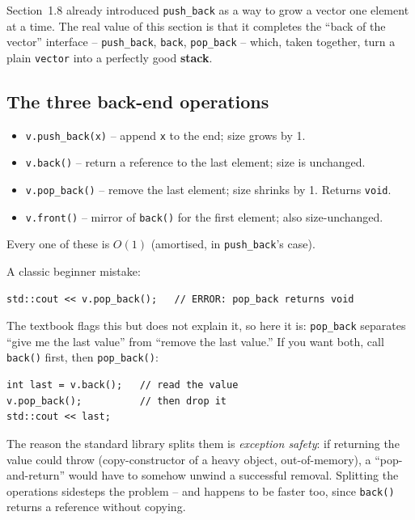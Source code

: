 \documentclass[11pt]{article}
\begin{document}
Section~1.8 already introduced \texttt{push\_back} as a way to grow a
vector one element at a time. The real value of this section is that
it completes the ``back of the vector'' interface -- \texttt{push\_back},
\texttt{back}, \texttt{pop\_back} -- which, taken together, turn a
plain \texttt{vector} into a perfectly good \textbf{stack}.

\subsection{The three back-end operations}

\begin{defnbox}
\begin{itemize}
    \item \texttt{v.push\_back(x)} -- append \texttt{x} to the end;
          size grows by 1.
    \item \texttt{v.back()} -- return a reference to the last element;
          size is unchanged.
    \item \texttt{v.pop\_back()} -- remove the last element; size
          shrinks by 1. Returns \texttt{void}.
    \item \texttt{v.front()} -- mirror of \texttt{back()} for the
          first element; also size-unchanged.
\end{itemize}
Every one of these is $O(1)$ (amortised, in \texttt{push\_back}'s
case).
\end{defnbox}

\begin{warnbox}
A classic beginner mistake:
\begin{lstlisting}
std::cout << v.pop_back();   // ERROR: pop_back returns void
\end{lstlisting}
The textbook flags this but does not explain it, so here it is:
\texttt{pop\_back} separates ``give me the last value'' from ``remove
the last value.'' If you want both, call \texttt{back()} first, then
\texttt{pop\_back()}:
\begin{lstlisting}
int last = v.back();   // read the value
v.pop_back();          // then drop it
std::cout << last;
\end{lstlisting}
The reason the standard library splits them is \emph{exception
safety}: if returning the value could throw (copy-constructor of a
heavy object, out-of-memory), a ``pop-and-return'' would have to
somehow unwind a successful removal. Splitting the operations
sidesteps the problem -- and happens to be faster too, since
\texttt{back()} returns a reference without copying.
\end{warnbox}
\end{document}
